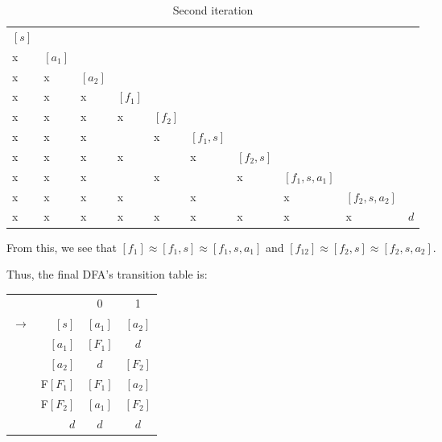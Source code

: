 \documentclass{article}
\theoremstyle{definition}
\begin{document}
\begin{enumerate}
\begin{enumerate}
\begin{table}[H]
	\centering
	\begin{tabular}{llllllllll}
		$[s]$ &         &         &         &         &           &           &               &               &     \\
		x     & $[a_1]$ &         &         &         &           &           &               &               &     \\
		x     & x       & $[a_2]$ &         &         &           &           &               &               &     \\
		x     & x       & x       & $[f_1]$ &         &           &           &               &               &     \\
		x     & x       & x       & x       & $[f_2]$ &           &           &               &               &     \\
		x     & x       & x       &         & x       & $[f_1,s]$ &           &               &               &     \\
		x     & x       & x       & x       &         & x         & $[f_2,s]$ &               &               &     \\
		x     & x       & x       &         & x       &           & x         & $[f_1,s,a_1]$ &               &     \\
		x     & x       & x       & x       &         & x         &           & x             & $[f_2,s,a_2]$ &     \\
		x     & x       & x       & x       & x       & x         & x         & x             & x             & $d$
	\end{tabular}
	\caption{Second iteration}
	\label{my-label}
\end{table}
	From this, we see that $[f_1] \approx [f_1,s] \approx [f_1,s,a_1]$ and $[f_12] \approx [f_2,s] \approx [f_2,s,a_2]$.

Thus, the final DFA's transition table is:
\begin{center}
	\begin{tabular}{cccc}
		& & 0 & 1 \\\cline{3-4}
		$\rightarrow$ & \multicolumn{1}{r|}{$[s]$} &$[a_1]$ & $[a_2]$ \\
		& \multicolumn{1}{r|}{$[a_1]$} & $[F_1]$ & $d$\\
		& \multicolumn{1}{r|}{$[a_2]$} & $d$ & $[F_2]$ \\
		& \multicolumn{1}{r|}{F$[F_1]$} & $[F_1]$ & $[a_2]$\\
		& \multicolumn{1}{r|}{F$[F_2]$} & $[a_1]$ & $[F_2]$\\
		& \multicolumn{1}{r|}{$d$} & $d$ & $d$\\
	\end{tabular}
\end{center}
	

\end{enumerate}
\end{enumerate}
\end{document}

